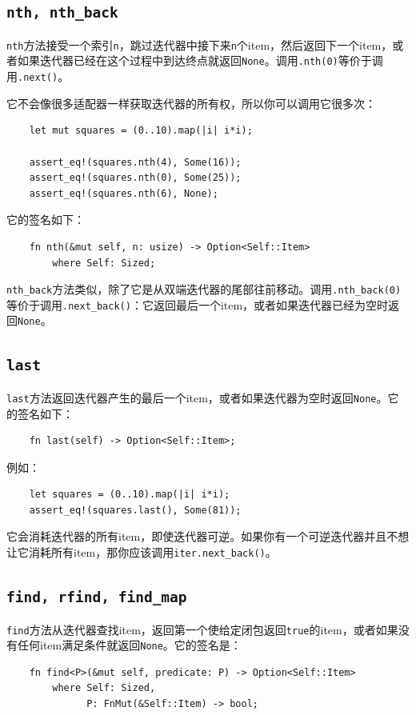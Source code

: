 \subsection{\texttt{nth, nth\_back}}
\texttt{nth}方法接受一个索引\texttt{n}，跳过迭代器中接下来\texttt{n}个item，然后返回下一个item，或者如果迭代器已经在这个过程中到达终点就返回\texttt{None}。调用\texttt{.nth(0)}等价于调用\texttt{.next()}。

它不会像很多适配器一样获取迭代器的所有权，所以你可以调用它很多次：
\begin{verbatim}
    let mut squares = (0..10).map(|i| i*i);

    assert_eq!(squares.nth(4), Some(16));
    assert_eq!(squares.nth(0), Some(25));
    assert_eq!(squares.nth(6), None);
\end{verbatim}

它的签名如下：
\begin{verbatim}
    fn nth(&mut self, n: usize) -> Option<Self::Item>
        where Self: Sized;
\end{verbatim}

\texttt{nth\_back}方法类似，除了它是从双端迭代器的尾部往前移动。调用\texttt{.nth\_back(0)}等价于调用\texttt{.next\_back()}：它返回最后一个item，或者如果迭代器已经为空时返回\texttt{None}。

\subsection{\texttt{last}}
\texttt{last}方法返回迭代器产生的最后一个item，或者如果迭代器为空时返回\texttt{None}。它的签名如下：
\begin{verbatim}
    fn last(self) -> Option<Self::Item>;
\end{verbatim}

例如：
\begin{verbatim}
    let squares = (0..10).map(|i| i*i);
    assert_eq!(squares.last(), Some(81));
\end{verbatim}

它会消耗迭代器的所有item，即使迭代器可逆。如果你有一个可逆迭代器并且不想让它消耗所有item，那你应该调用\texttt{iter.next\_back()}。

\subsection{\texttt{find, rfind, find\_map}}
\texttt{find}方法从迭代器查找item，返回第一个使给定闭包返回\texttt{true}的item，或者如果没有任何item满足条件就返回\texttt{None}。它的签名是：
\begin{verbatim}
    fn find<P>(&mut self, predicate: P) -> Option<Self::Item>
        where Self: Sized,
              P: FnMut(&Self::Item) -> bool;
\end{verbatim}

